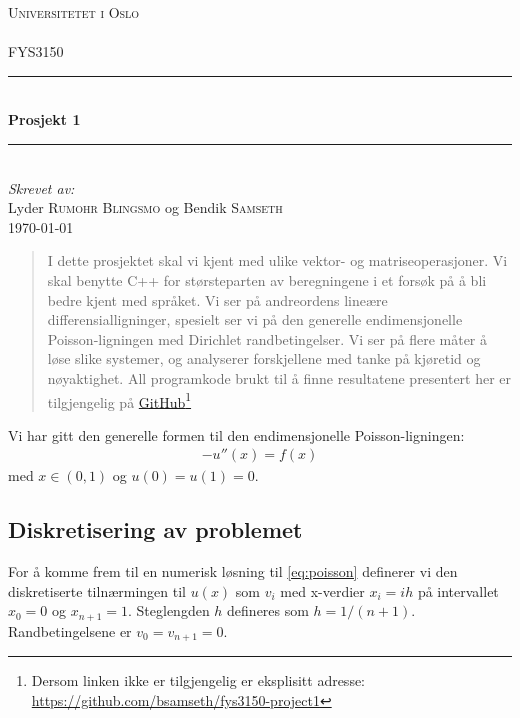 \documentclass[11pt]{article}
\begin{document}
\begin{titlepage}
\newcommand{\HRule}{\rule{\linewidth}{0.5mm}}
\center
\textsc{\LARGE Universitetet i Oslo}\\[1.5cm] %
\textsc{\Large }\\[0.5cm] %
\textsc{\large FYS3150}\\[0.5cm] %
\HRule \\[0.4cm]
{ \huge \bfseries Prosjekt 1 }\\[0.4cm] %
\HRule \\[1.5cm]
\Large \emph{Skrevet av:}\\
Lyder \textsc{Rumohr Blingsmo} og Bendik \textsc{Samseth}\\[3cm]
{\large \today}\\[3cm]
\vfill
\end{titlepage}


\begin{abstract}
I dette prosjektet skal vi kjent med ulike vektor- og
matriseoperasjoner. Vi skal benytte C++ for størsteparten av
beregningene i et forsøk på å bli bedre kjent med språket. Vi ser på
andreordens lineære differensialligninger, spesielt ser vi på den
generelle endimensjonelle Poisson-ligningen med Dirichlet
randbetingelser. Vi ser på flere måter å løse slike systemer, og
analyserer forskjellene med tanke på kjøretid og nøyaktighet. All
programkode brukt til å finne resultatene presentert her er
tilgjengelig på
\href{https://github.com/bsamseth/fys3150-project1}{GitHub}\footnote{\label{GitHub-link}Dersom
  linken ikke er tilgjengelig er eksplisitt adresse: \url{https://github.com/bsamseth/fys3150-project1}}
\end{abstract}


Vi har gitt den generelle formen til den endimensjonelle
Poisson-ligningen:
\begin{align}
  -u''(x) = f(x)\label{eq:poisson}
\end{align}
med $x \in (0,1)$ og $u(0) = u(1) = 0$.

\subsection{Diskretisering av problemet}

For å komme frem til en numerisk løsning til \eqref{eq:poisson}
definerer vi den diskretiserte tilnærmingen til $u(x)$ som $v_i$ med
x-verdier $x_i = ih$ på intervallet $x_0 = 0$ og $x_{n+1} =1$. Steglengden $h$ defineres som $h =
1/(n+1)$. Randbetingelsene er $v_0 = v_{n+1} = 0$.
\end{document}
